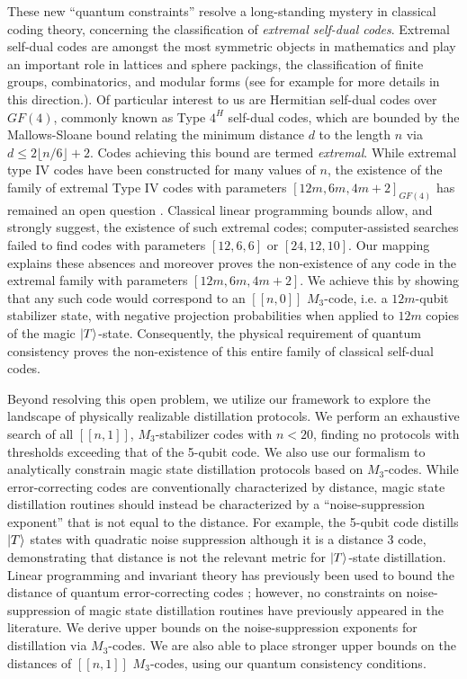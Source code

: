 \documentclass[11pt]{article}
\def\ket#1{\mathinner{|{#1}\rangle}}
\begin{document}
These new ``quantum constraints'' resolve a long-standing mystery in classical coding theory, concerning the classification of \textit{extremal self-dual codes}. Extremal self-dual codes are amongst the most symmetric objects in mathematics and play an important role in lattices and sphere packings, the classification of finite groups, combinatorics, and modular forms (see for example \cite{elkies2000lattices,ebeling1994lattices} for more details in this direction.). Of particular interest to us are Hermitian self-dual codes over $GF(4)$, commonly known as Type $4^H$ self-dual codes, which are bounded by the Mallows-Sloane bound \cite{MALLOWS1973188} relating the minimum distance $d$ to the length $n$ via $d \leq 2 \lfloor n/6 \rfloor + 2$. Codes achieving this bound are termed \textit{extremal}. While extremal type IV codes have  been constructed  for many values of $n$, the existence of the family of extremal Type IV codes with parameters $[12m,6m,4m+2]_{GF(4)}$ has remained an open question \cite{macwilliams1978self, lam1990there, huffman1990extremal, huffman1991extremal, rains2002self}. 
Classical linear programming bounds allow, and strongly suggest, the existence of such extremal codes; computer-assisted searches failed to find codes with parameters $[12,6,6]$ or $[24,12,10]$. Our mapping explains these absences and moreover proves the non-existence of any code in the extremal family with parameters $[12m,6m,4m+2]$. We achieve this by showing that any such code would correspond to an $[[n,0]]$ $M_3$-code, i.e. a $12m$-qubit stabilizer state, with negative projection probabilities when applied to $12m$ copies of the magic $\ket{T}$-state. Consequently, the physical requirement of quantum consistency proves the  non-existence of this entire family of classical self-dual codes.

Beyond resolving this open problem, we utilize our framework to explore the landscape of physically realizable distillation protocols. We perform an exhaustive search of all $[[n,1]]$, $M_3$-stabilizer codes with $n<20$, finding no protocols with thresholds exceeding that of the 5-qubit code. We also use our formalism to analytically constrain magic state distillation protocols based on $M_3$-codes. While error-correcting codes are conventionally characterized by distance, magic state distillation routines should instead be characterized by a ``noise-suppression exponent'' that is not equal to the distance. 
For example, the 5-qubit code distills $\ket{T}$ states with quadratic noise suppression although it is a distance $3$ code, demonstrating that distance is not the relevant metric for $\ket{T}$-state distillation. Linear programming and invariant theory has previously been used to bound the distance of quantum error-correcting codes \cite{rains,rains1998quantum}; however, no constraints on noise-suppression of magic state distillation routines have previously appeared in the literature.  We derive upper bounds on the noise-suppression exponents for distillation via $M_3$-codes. We are also able to place stronger upper bounds on the distances of $[[n,1]]$ $M_3$-codes, using our quantum consistency conditions. 
\end{document}
